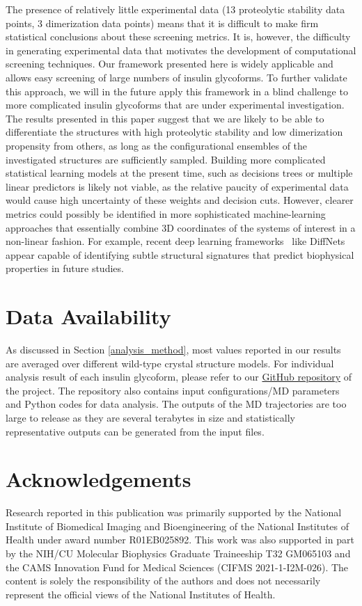 \documentclass[sn-vancouver]{sn-jnl}
\begin{document}
The presence of relatively little experimental data (13 proteolytic stability data points, 3 dimerization data points) means that it is difficult to make firm statistical conclusions about these screening metrics.  It is, however, the difficulty in generating experimental data that motivates the development of computational screening techniques.  Our framework presented here is widely applicable and allows easy screening of large numbers of insulin glycoforms. To further validate this approach, we will in the future apply this framework in a blind challenge to more complicated insulin glycoforms that are under experimental investigation. The results presented in this paper suggest that we are likely to be able to differentiate the structures with high proteolytic stability and low dimerization propensity from others, as long as the configurational ensembles of the investigated structures are sufficiently sampled. Building more complicated statistical learning models at the present time, such as decisions trees or multiple linear predictors is likely not viable, as the relative paucity of experimental data would cause high uncertainty of these weights and decision cuts. However, clearer metrics could possibly be identified in more sophisticated machine-learning approaches that essentially combine 3D coordinates of the systems of interest in a non-linear fashion. For example, recent deep learning frameworks~\cite{ward2021deep} like DiffNets appear capable of identifying subtle structural signatures that predict biophysical properties in future studies.



\section{Data Availability}
As discussed in Section \ref{analysis_method}, most values reported in our results are averaged over different wild-type crystal structure models. For individual analysis result of each insulin glycoform, please refer to our \href{https://github.com/shirtsgroup/Glycoinsulin_project}{GitHub repository} of the project. The repository also contains input configurations/MD parameters and Python codes for data analysis. The outputs of the MD trajectories are too large to release as they are several terabytes in size and statistically representative outputs can be generated from the input files.   
\section{Acknowledgements}
Research reported in this publication was primarily supported by the National Institute of Biomedical Imaging and Bioengineering of the National Institutes of Health under award number R01EB025892. This work was also supported in part by the NIH/CU Molecular Biophysics Graduate Traineeship T32 GM065103 and the CAMS Innovation Fund for Medical Sciences (CIFMS 2021-1-I2M-026). The content is solely the responsibility of the authors and does not necessarily represent the official views of the National Institutes of Health.
\end{document}
